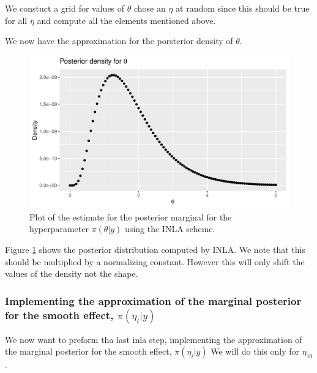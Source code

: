 We constuct a grid for values of $\theta$ chose an $\eta$ at random since this should be true for all $\eta$ and compute all the elements mentioned above.  





We now have the approximation for the porsterior density of $\theta$.
\begin{figure}[h!]
    \centering
    \includegraphics[width=\textwidth]{Images/post_theta_inla.pdf}
    \caption{Plot of the estimate for the posterior marginal for the hyperparameter $\pi(\theta|y)$ using the INLA scheme.}
    \label{fig:post_theta_inla}
\end{figure}

Figure \ref{fig:post_theta_inla} shows the posterior distribution computed by INLA. We note that this should be multiplied by a normalizing constant. However this will only shift the values of the density not the shape. 

\subsubsection{Implementing the approximation of the marginal posterior for the smooth effect, $\pi(\eta_i | y)$}

We now want to preform tha last inla step, implementing the approximation of the marginal posterior for the smooth effect, $\pi(\eta_i | y)$ We will do this only for $\eta_{10}$. 

